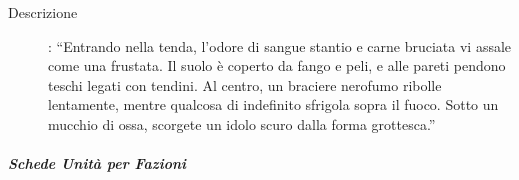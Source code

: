 \documentclass{article}
\begin{document}
\begin{description}
\begin{description}
\begin{description}
                \end{description}
            \item[Tenda: ] 
              \begin{description}
                \item[Descrizione]: “Entrando nella tenda, l’odore di sangue stantio e carne bruciata vi assale come una frustata. Il suolo è coperto da fango e peli, e alle pareti pendono teschi legati con tendini. Al centro, un braciere nerofumo ribolle lentamente, mentre qualcosa di indefinito sfrigola sopra il fuoco. Sotto un mucchio di ossa, scorgete un idolo scuro dalla forma grottesca.” 
              \end{description}
        \end{description}
\end{description}
\subparagraph*{Schede Unità per Fazioni}
\end{document}
